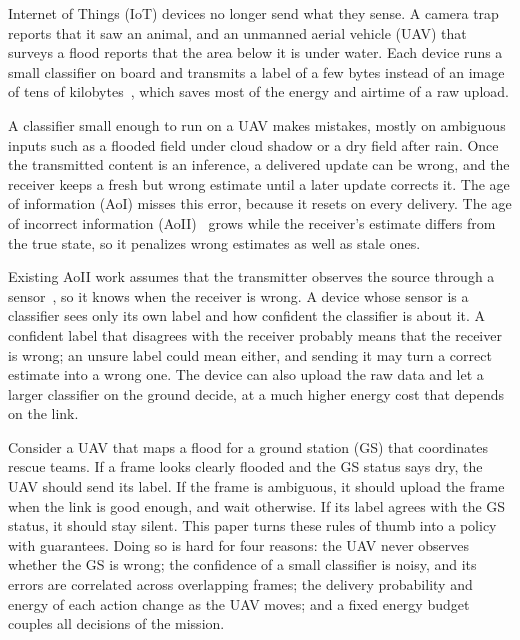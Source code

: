 \documentclass[10pt,journal,compsoc]{IEEEtran}
\theoremstyle{remark}
\begin{document}
 Internet of Things (IoT) devices no longer send what they sense. A camera trap reports that it saw an animal, and an unmanned aerial vehicle (UAV) that surveys a flood reports that the area below it is under water. Each device runs a small classifier on board and transmits a label of a few bytes instead of an image of tens of kilobytes~\cite{shamsoshoara2021flame,kyrkou2020aider}, which saves most of the energy and airtime of a raw upload.

A classifier small enough to run on a UAV makes mistakes, mostly on ambiguous inputs such as a flooded field under cloud shadow or a dry field after rain. Once the transmitted content is an inference, a delivered update can be wrong, and the receiver keeps a fresh but wrong estimate until a later update corrects it. The age of information (AoI) misses this error, because it resets on every delivery. The age of incorrect information (AoII)~\cite{maatouk2020aoii} grows while the receiver's estimate differs from the true state, so it penalizes wrong estimates as well as stale ones.

Existing AoII work assumes that the transmitter observes the source through a sensor~\cite{maatouk2020aoii,zakeri2023aoiieh,ngo2025eh}, so it knows when the receiver is wrong. A device whose sensor is a classifier sees only its own label and how confident the classifier is about it. A confident label that disagrees with the receiver probably means that the receiver is wrong; an unsure label could mean either, and sending it may turn a correct estimate into a wrong one. The device can also upload the raw data and let a larger classifier on the ground decide, at a much higher energy cost that depends on the link.

Consider a UAV that maps a flood for a ground station (GS) that coordinates rescue teams. If a frame looks clearly flooded and the GS status says dry, the UAV should send its label. If the frame is ambiguous, it should upload the frame when the link is good enough, and wait otherwise. If its label agrees with the GS status, it should stay silent. This paper turns these rules of thumb into a policy with guarantees. Doing so is hard for four reasons: the UAV never observes whether the GS is wrong; the confidence of a small classifier is noisy, and its errors are correlated across overlapping frames; the delivery probability and energy of each action change as the UAV moves; and a fixed energy budget couples all decisions of the mission.
\end{document}
